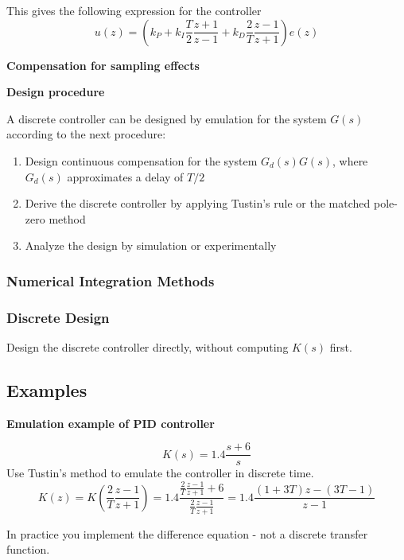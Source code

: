 This gives the following expression for the controller
$$u(z) = (k_P+k_I \frac{T}{2} \frac{z+1}{z-1}+k_D \frac{2}{T} \frac{z-1}{z+1})e(z)$$


\textbf{Compensation for sampling effects}

\newpage
\textbf{Design procedure}

A discrete controller can be designed by emulation for the system $G(s)$ according to the next procedure:

\begin{enumerate}
	\item{Design continuous compensation for the system $G_d(s)G(s)$, where $G_d(s)$ approximates a delay of $T/2$}
	\item{Derive the discrete controller by applying Tustin's rule or the matched pole-zero method}
	\item{Analyze the design by simulation or experimentally}
\end{enumerate}



\subsubsection{Numerical Integration Methods}





\subsubsection{Discrete Design}
Design the discrete controller directly, without computing $K(s)$ first.

\subsection{Examples}

\textbf{Emulation example of PID controller}

$$K(s) = 1.4 \frac{s+6}{s}$$
Use Tustin's method to emulate the controller in discrete time.
$$K(z) = K(\frac{2}{T} \frac{z-1}{z+1}) = 1.4 \frac{\frac{2}{T} \frac{z-1}{z+1}+6}{\frac{2}{T} \frac{z-1}{z+1}}
	= 1.4 \frac{(1+3T)z-(3T-1)}{z-1}$$

In practice you implement the difference equation - not a discrete transfer function.
